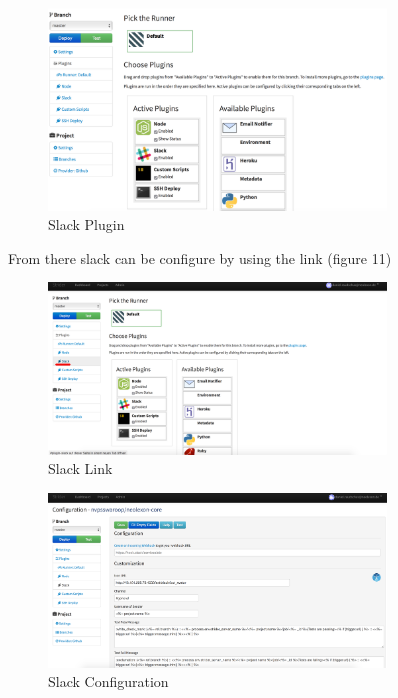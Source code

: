 \begin{figure}[h!]
  \centering
  \includegraphics[width=0.8\textwidth]{images/slack.png}
  \caption{Slack Plugin}
\end{figure}

From there slack can be configure by using the link (figure 11)

\begin{figure}[h!]
  \centering
  \includegraphics[width=0.8\textwidth]{images/slack_link.png}
  \caption{Slack Link}
\end{figure}

\begin{figure}[h!]
  \centering
  \includegraphics[width=0.8\textwidth]{images/slack_config.png}
  \caption{Slack Configuration}
\end{figure}

